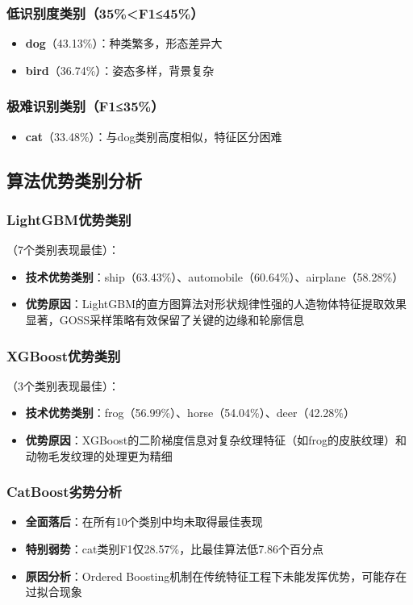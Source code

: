 \documentclass[UTF8]{report}
\theoremstyle{MyLineTheoremStyle} %
\theoremstyle{MyBlockTheoremStyle} %
\theoremstyle{MySubsubsectionStyle} %
\begin{document}
\subsubsection{低识别度类别（35\%<F1≤45\%）}
\begin{itemize}
    \item \textbf{dog}（43.13\%）：种类繁多，形态差异大
    \item \textbf{bird}（36.74\%）：姿态多样，背景复杂
\end{itemize}
\subsubsection{极难识别类别（F1≤35\%）}
\begin{itemize}
    \item \textbf{cat}（33.48\%）：与dog类别高度相似，特征区分困难
\end{itemize}

\subsection{算法优势类别分析}
\subsubsection{LightGBM优势类别}（7个类别表现最佳）：
\begin{itemize}
    \item \textbf{技术优势类别}：ship（63.43\%）、automobile（60.64\%）、airplane（58.28\%）
    \item \textbf{优势原因}：LightGBM的直方图算法对形状规律性强的人造物体特征提取效果显著，GOSS采样策略有效保留了关键的边缘和轮廓信息
\end{itemize}
\subsubsection{XGBoost优势类别}（3个类别表现最佳）：
\begin{itemize}
    \item \textbf{技术优势类别}：frog（56.99\%）、horse（54.04\%）、deer（42.28\%）
    \item \textbf{优势原因}：XGBoost的二阶梯度信息对复杂纹理特征（如frog的皮肤纹理）和动物毛发纹理的处理更为精细
\end{itemize}
\subsubsection{CatBoost劣势分析}
\begin{itemize}
    \item \textbf{全面落后}：在所有10个类别中均未取得最佳表现
    \item \textbf{特别弱势}：cat类别F1仅28.57\%，比最佳算法低7.86个百分点
    \item \textbf{原因分析}：Ordered Boosting机制在传统特征工程下未能发挥优势，可能存在过拟合现象
\end{itemize}
\end{document}
